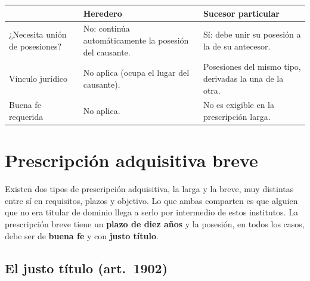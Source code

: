 \documentclass[12pt,oneside]{book}
\begin{document}

\begin{table}[H]
\centering
\begin{tabularx}{\textwidth}{@{}>{\raggedright\arraybackslash}p{}>{\raggedright\arraybackslash}X>{\raggedright\arraybackslash}X@{}}
\toprule
 & \textbf{Heredero} & \textbf{Sucesor particular} \\
\midrule
¿Necesita unión de posesiones? & No: continúa automáticamente la posesión del causante. & Sí: debe unir su posesión a la de su antecesor. \\
Vínculo jurídico & No aplica (ocupa el lugar del causante). & Posesiones del mismo tipo, derivadas la una de la otra. \\
Buena fe requerida & No aplica. & No es exigible en la prescripción larga. \\
\bottomrule
\end{tabularx}
\end{table}

\section{Prescripción adquisitiva breve}

Existen dos tipos de prescripción adquisitiva, la larga y la breve, muy distintas entre sí en requisitos, plazos y objetivo. Lo que ambas comparten es que alguien que no era titular de dominio llega a serlo por intermedio de estos institutos. La prescripción breve tiene un \textbf{plazo de diez años} y la posesión, en todos los casos, debe ser de \textbf{buena fe} y con \textbf{justo título}.


\subsection{El justo título (art.~1902)}
\end{document}
